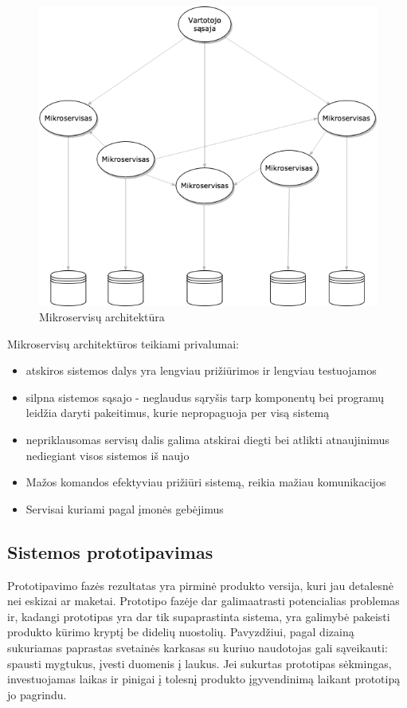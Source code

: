 \documentclass{VUMIFPSkursinis}
\begin{document}
	\begin{figure}[H]
	\centering
	\includegraphics[scale=0.6]{img/micro.png}
	\caption{Mikroservisų architektūra}
	\label{img:mikroservizai}
	\end{figure}
	Mikroservisų architektūros teikiami privalumai:
	\begin{itemize}
		\item{atskiros sistemos dalys yra lengviau prižiūrimos ir lengviau testuojamos}
		\item{silpna sistemos sąsajo - neglaudus sąryšis tarp komponentų bei programų leidžia daryti pakeitimus, kurie nepropaguoja per visą sistemą}
		\item{nepriklausomas servisų dalis galima atskirai diegti bei atlikti atnaujinimus nediegiant visos sistemos iš naujo}
		\item{Mažos komandos efektyviau prižiūri sistemą, reikia mažiau komunikacijos}
		\item{Servisai kuriami pagal įmonės gebėjimus}
	\end{itemize}

	\subsection{Sistemos prototipavimas}
	Prototipavimo fazės rezultatas yra pirminė produkto versija, kuri jau detalesnė nei eskizai ar maketai. Prototipo fazėje dar galimaatrasti potencialias problemas ir, kadangi prototipas yra dar tik supaprastinta sistema, yra galimybė pakeisti produkto kūrimo kryptį be didelių nuostolių. Pavyzdžiui, pagal dizainą sukuriamas paprastas svetainės karkasas su kuriuo naudotojas gali sąveikauti: spausti mygtukus, įvesti duomenis į laukus. Jei sukurtas prototipas sėkmingas, investuojamas laikas ir pinigai į tolesnį produkto įgyvendinimą laikant prototipą jo pagrindu.
\end{document}
